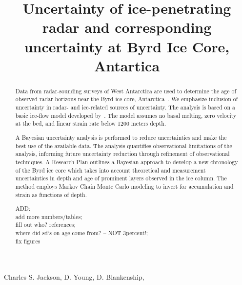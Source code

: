 \documentclass[jgrga]{agutex}
\begin{document}
\title{Uncertainty of ice-penetrating radar and corresponding uncertainty at Byrd Ice Core, Antartica}

 Charles S. Jackson,  D. Young,  D. Blankenship,  




\begin{abstract}
Data from radar-sounding surveys of West Antarctica are used to determine the age of observed radar horizons near the Byrd ice core, Antarctica~\citep{gow1968}. We emphasize inclusion of uncertainty in radar- and ice-related sources of uncertainty. The analysis is based on a basic ice-flow model developed by~\citet{schwander2001}. The model assumes no basal melting, zero velocity at the bed, and linear strain rate below 1200 meters depth.

A Bayesian uncertainty analysis is performed to reduce uncertainties and make the best use of the available data. The analysis quantifies observational limitations of the analysis, informing future uncertainty reduction through refinement of observational techniques. A Research Plan outlines a Bayesian approach to develop a new chronology of the Byrd ice core which takes into account theoretical and measurement uncertainties in depth and age of prominent layers observed in the ice column. The method employs Markov Chain Monte Carlo modeling to invert for accumulation and strain as functions of depth. 

ADD: \\
	add more numbers/tables;\\
	fill out who? references;\\
	where did sd's on age come from? -- NOT 3percent!;\\
	fix figures \\


\end{abstract}
\end{document}
